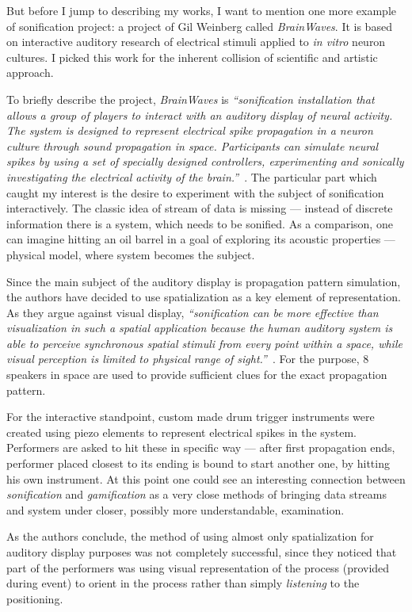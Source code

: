\documentclass[12pt,a4paper,oneside]{report}
\begin{document}
But before I jump to describing my works, I want to mention one more example of sonification project: a project of Gil Weinberg called \emph{BrainWaves}. It is based on interactive auditory research of electrical stimuli applied to \emph{in vitro} neuron cultures. I picked this work for the inherent collision of scientific and artistic approach.

To briefly describe the project, \emph{BrainWaves} is \emph{``sonification installation that allows a group of players to interact with an auditory display of neural activity. The system is designed to represent electrical spike propagation in a neuron culture through sound propagation in space. Participants can simulate neural spikes by using a set of specially designed controllers, experimenting and sonically investigating the electrical activity of the brain.''}~\cite[p.~9]{Weinberg2006}. The particular part which caught my interest is the desire to experiment with the subject of sonification interactively. The classic idea of stream of data is missing --- instead of discrete information there is a system, which needs to be sonified. As a comparison, one can imagine hitting an oil barrel in a goal of exploring its acoustic properties --- physical model, where system becomes the subject.

Since the main subject of the auditory display is propagation pattern simulation, the authors have decided to use spatialization as a key element of representation. As they argue against visual display, \emph{``sonification can be more effective than visualization in such a spatial application because the human auditory system is able to perceive synchronous spatial stimuli from every point within a space, while visual perception is limited to physical range of sight.''}~\cite[p.~9]{Weinberg2006}. For the purpose, 8 speakers in space are used to provide sufficient clues for the exact propagation pattern.

For the interactive standpoint, custom made drum trigger instruments were created using piezo elements to represent electrical spikes in the system. Performers are asked to hit these in specific way --- after first propagation ends, performer placed closest to its ending is bound to start another one, by hitting his own instrument. At this point one could see an interesting connection between \emph{sonification} and \emph{gamification} as a very close methods of bringing data streams and system under closer, possibly more understandable, examination.

As the authors conclude, the method of using almost only spatialization for auditory display purposes was not completely successful, since they noticed that part of the performers was using visual representation of the process (provided during event) to orient in the process rather than simply \emph{listening} to the positioning. 
\end{document}
